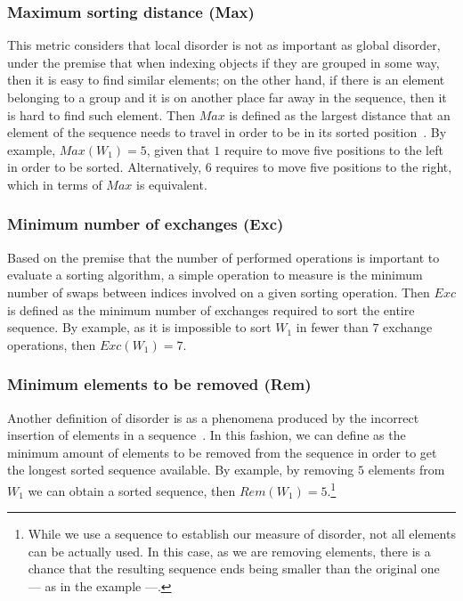 \subsubsection{Maximum sorting distance (Max)}
This metric considers that local disorder is not as important as global disorder, under the premise that when indexing objects if they are grouped in some way, then it is easy to find similar elements; on the other hand, if there is an element belonging to a group and it is on another place far away in the sequence, then it is hard to find such element. Then $Max$ is defined as the largest distance that an element of the sequence needs to travel in order to be in its sorted position~\cite{Estivill-Castro_Wood_1989}. By example, $Max(W_1) = 5$, given that $1$ require to move five positions to the left in order to be sorted. Alternatively, $6$ requires to move five positions to the right, which in terms of $Max$ is equivalent.\\

\subsubsection{Minimum number of exchanges (Exc)}
Based on the premise that the number of performed operations is important to evaluate a sorting algorithm, a simple operation to measure is the minimum number of swaps between indices involved on a given sorting operation. Then $Exc$ is defined as the minimum number of exchanges required to sort the entire sequence\cite{Mannila_1985}. By example, as it is impossible to sort $W_1$ in fewer than $7$ exchange operations, then $Exc(W_1)=7$.\\

\subsubsection{Minimum elements to be removed (Rem)}
Another definition of disorder is as a phenomena produced by the incorrect insertion of elements in a sequence~\cite{10.5555/270146}. In this fashion, we can define as the minimum amount of elements to be removed from the sequence in order to get the longest sorted sequence available. By example, by removing $5$ elements from $W_1$ we can obtain a sorted sequence, then $Rem(W_1) = 5$.\footnote{While we use a sequence to establish our measure of disorder, not all elements can be actually used. In this case, as we are removing elements, there is a chance that the resulting sequence ends being smaller than the original one --- as in the example ---.}

